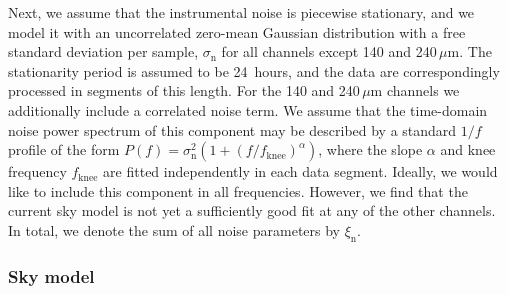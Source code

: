 \documentclass{aa}
\begin{document}
Next, we assume that the instrumental noise is piecewise stationary,
and we model it with an uncorrelated zero-mean Gaussian distribution
with a free standard deviation per sample, $\sigma_{\mathrm{n}}$ for
all channels except 140 and 240\,$\mu$m. The stationarity period is assumed to
be 24~hours, and the data are correspondingly processed in segments of
this length. For the 140 and 240\,$\mu$m channels we additionally include a
correlated noise term.  We assume that the time-domain noise power
spectrum of this component may be described by a standard $1/f$
profile of the form $P(f) = \sigma_{\mathrm{n}}^2
(1+(f/f_{\mathrm{knee}})^{\alpha})$, where the slope $\alpha$ and knee
frequency $f_{\mathrm{knee}}$ are fitted independently in each data
segment. Ideally, we would like to include this component in all
frequencies. However, we find that the current sky model is not yet
a sufficiently good fit at any of the other channels. In
total, we denote the sum of all noise parameters by
$\xi_{\mathrm{n}}$.


\subsubsection{Sky model}
\label{sec:skymodel}
\end{document}
